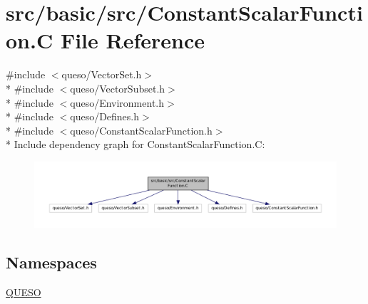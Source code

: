 \hypertarget{_constant_scalar_function_8_c}{\section{src/basic/src/\-Constant\-Scalar\-Function.C File Reference}
\label{_constant_scalar_function_8_c}
}
{\ttfamily \#include $<$queso/\-Vector\-Set.\-h$>$}\\*
{\ttfamily \#include $<$queso/\-Vector\-Subset.\-h$>$}\\*
{\ttfamily \#include $<$queso/\-Environment.\-h$>$}\\*
{\ttfamily \#include $<$queso/\-Defines.\-h$>$}\\*
{\ttfamily \#include $<$queso/\-Constant\-Scalar\-Function.\-h$>$}\\*
Include dependency graph for Constant\-Scalar\-Function.\-C\-:
\nopagebreak
\begin{figure}[H]
\begin{center}
\leavevmode
\includegraphics[width=350pt]{_constant_scalar_function_8_c__incl}
\end{center}
\end{figure}
\subsection*{Namespaces}
\begin{DoxyCompactItemize}
\item 
\hyperlink{namespace_q_u_e_s_o}{Q\-U\-E\-S\-O}
\end{DoxyCompactItemize}

